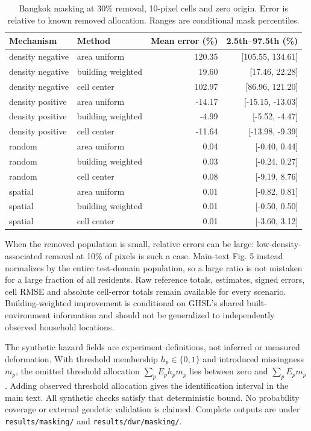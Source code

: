 \documentclass[10pt,a4paper]{article}
\begin{document}
\begin{table}[htbp]\centering\small
\caption{Bangkok masking at 30\% removal, 10-pixel cells and zero origin. Error is relative to known removed allocation. Ranges are conditional mask percentiles.}
\begin{tabular}{llrr}\toprule
Mechanism & Method & Mean error (\%) & 2.5th--97.5th (\%)\\\midrule
density negative & area uniform & 120.35 & [105.55, 134.61] \\
density negative & building weighted & 19.60 & [17.46, 22.28] \\
density negative & cell center & 102.97 & [86.96, 121.20] \\
density positive & area uniform & -14.17 & [-15.15, -13.03] \\
density positive & building weighted & -4.99 & [-5.52, -4.47] \\
density positive & cell center & -11.64 & [-13.98, -9.39] \\
random & area uniform & 0.04 & [-0.40, 0.44] \\
random & building weighted & 0.03 & [-0.24, 0.27] \\
random & cell center & 0.08 & [-9.19, 8.76] \\
spatial & area uniform & 0.01 & [-0.82, 0.81] \\
spatial & building weighted & 0.01 & [-0.50, 0.50] \\
spatial & cell center & 0.01 & [-3.60, 3.12] \\
\bottomrule\end{tabular}

\end{table}

When the removed population is small, relative errors can be large: low-density-associated removal at 10\% of pixels is such a case. Main-text Fig. 5 instead normalizes by the entire test-domain population, so a large ratio is not mistaken for a large fraction of all residents. Raw reference totals, estimates, signed errors, cell RMSE and absolute cell-error totals remain available for every scenario. Building-weighted improvement is conditional on GHSL's shared built-environment information and should not be generalized to independently observed household locations.

The synthetic hazard fields are experiment definitions, not inferred or measured deformation. With threshold membership $h_p\in\{0,1\}$ and introduced missingness $m_p$, the omitted threshold allocation $\sum_p E_p h_p m_p$ lies between zero and $\sum_p E_p m_p$. Adding observed threshold allocation gives the identification interval in the main text. All synthetic checks satisfy that deterministic bound. No probability coverage or external geodetic validation is claimed. Complete outputs are under \texttt{results/masking/} and \texttt{results/dwr/masking/}.
\end{document}
